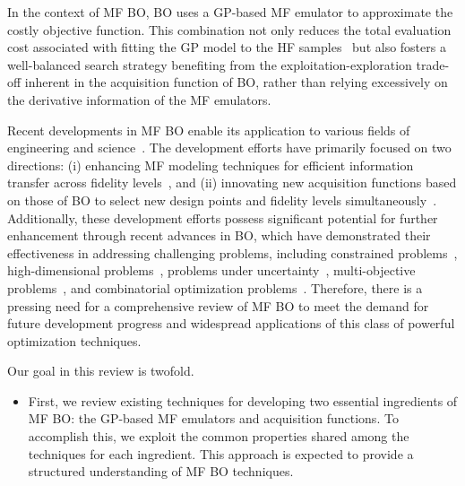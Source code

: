 \documentclass[iicol,sn-basic]{sn-jnl}%
\theoremstyle{thmstyleone}%
\theoremstyle{thmstyletwo}
\theoremstyle{thmstylethree}
\begin{document}
\begin{linenumbers}
In the context of MF BO, BO uses a GP-based MF emulator to approximate the costly objective function.
This combination not only reduces the total evaluation cost associated with fitting the GP model to the HF samples~\citep{Huang2006,Forrester2007} but also fosters a well-balanced search strategy benefiting from the exploitation-exploration trade-off inherent in the acquisition function of BO, rather than relying excessively on the derivative information of the MF emulators.
 
Recent developments in MF BO enable its application to various fields of engineering and science~\citep{Perdikaris2017,Meliani2019,Tran2020a,Tran2020b,Hebbal2021a,Khatamsaz2021b,Foumani2023,Winter2023}.
The development efforts have primarily focused on two directions: (i) enhancing MF modeling techniques for efficient information transfer across fidelity levels~\citep{Kennedy2000,Forrester2007,Han2012,Gratiet2014,Kandasamy2017,Perdikaris2017,Cutajar2019}, and (ii) innovating new acquisition functions based on those of BO to select new design points and fidelity levels simultaneously~\citep{Huang2006,Chen2016,Kandasamy2017,YZhang2018,Ghoreishi2019,Ruan2020,Sacher2021,He2021,Renganathan2021,Fiore2023,Huang2023}.
Additionally, these development efforts possess significant potential for further enhancement through recent advances in BO, which have demonstrated their effectiveness in addressing challenging problems, including constrained problems~\citep{Schonlau1998,Gramacy2011,Picheny2014,Gramacy2016}, high-dimensional problems~\citep{Eriksson2019,Eriksson2021,Daulton2022a}, problems under uncertainty~\citep{Huang2006a,Picheny2013,Forrester2006,Scott2011,Daulton2021,Daulton2022b}, multi-objective problems~\citep{Knowles2006,QZhang2010,Couckuyt2014,Bradford2018,Daulton2020,Picheny2015}, and combinatorial optimization problems~\citep{GomezBombarelli2018,GarridoMerchan2020}.
Therefore, there is a pressing need for a comprehensive review of MF BO to meet the demand for future development progress and widespread applications of this class of powerful optimization techniques.

Our goal in this review is twofold.
\begin{itemize}
    \item First, we review existing techniques for developing two essential ingredients of MF BO: the GP-based MF emulators and acquisition functions.
    To accomplish this, we exploit the common properties shared among the techniques for each ingredient.
    This approach is expected to provide a structured understanding of MF BO techniques.
	

\end{itemize}
\end{linenumbers}
\end{document}

